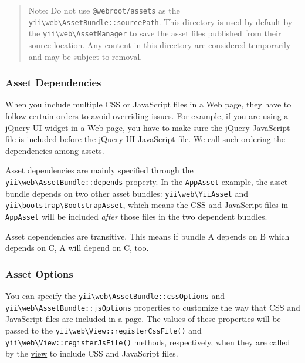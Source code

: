 \begin{quote}Note: Do not use \lstinline|@webroot/assets| as the \texttt{yii{\allowbreak{}\textbackslash}web{\allowbreak{}\textbackslash}AssetBundle\allowbreak{}::\allowbreak{}sourcePath}.
  This directory is used by default by the \texttt{yii{\allowbreak{}\textbackslash}web{\allowbreak{}\textbackslash}AssetManager} to save the asset files
  published from their source location. Any content in this directory are considered temporarily and may be subject
  to removal.

\end{quote}
\subsubsection{Asset Dependencies \label{structure-assets.md::asset-dependencies}}
When you include multiple CSS or JavaScript files in a Web page, they have to follow certain orders to avoid
overriding issues. For example, if you are using a jQuery UI widget in a Web page, you have to make sure
the jQuery JavaScript file is included before the jQuery UI JavaScript file. We call such ordering the dependencies
among assets.

Asset dependencies are mainly specified through the \texttt{yii{\allowbreak{}\textbackslash}web{\allowbreak{}\textbackslash}AssetBundle\allowbreak{}::\allowbreak{}depends} property.
In the \lstinline|AppAsset| example, the asset bundle depends on two other asset bundles: \texttt{yii{\allowbreak{}\textbackslash}web{\allowbreak{}\textbackslash}YiiAsset} and
\texttt{yii{\allowbreak{}\textbackslash}bootstrap{\allowbreak{}\textbackslash}BootstrapAsset}, which means the CSS and JavaScript files in \lstinline|AppAsset| will be included \textit{after}
those files in the two dependent bundles.

Asset dependencies are transitive. This means if bundle A depends on B which depends on C, A will depend on C, too.

\subsubsection{Asset Options \label{structure-assets.md::asset-options}}
You can specify the \texttt{yii{\allowbreak{}\textbackslash}web{\allowbreak{}\textbackslash}AssetBundle\allowbreak{}::\allowbreak{}cssOptions} and \texttt{yii{\allowbreak{}\textbackslash}web{\allowbreak{}\textbackslash}AssetBundle\allowbreak{}::\allowbreak{}jsOptions}
properties to customize the way that CSS and JavaScript files are included in a page. The values of these properties
will be passed to the \texttt{yii{\allowbreak{}\textbackslash}web{\allowbreak{}\textbackslash}View\allowbreak{}::\allowbreak{}registerCssFile()} and \texttt{yii{\allowbreak{}\textbackslash}web{\allowbreak{}\textbackslash}View\allowbreak{}::\allowbreak{}registerJsFile()} methods, respectively, when
they are called by the \hyperref[structure-views.md]{view} to include CSS and JavaScript files.

